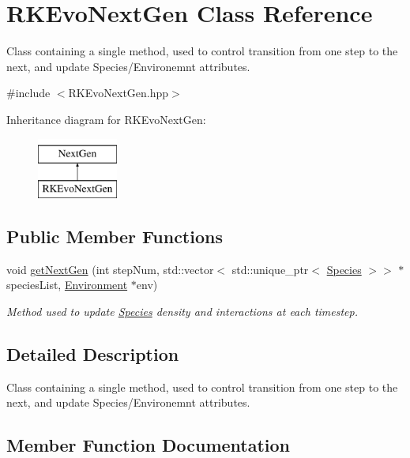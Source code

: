 \hypertarget{classRKEvoNextGen}{}\section{R\+K\+Evo\+Next\+Gen Class Reference}
\label{classRKEvoNextGen}


Class containing a single method, used to control transition from one step to the next, and update Species/\+Environemnt attributes.  




{\ttfamily \#include $<$R\+K\+Evo\+Next\+Gen.\+hpp$>$}

Inheritance diagram for R\+K\+Evo\+Next\+Gen\+:\begin{figure}[H]
\begin{center}
\leavevmode
\includegraphics[height=2.000000cm]{classRKEvoNextGen}
\end{center}
\end{figure}
\subsection*{Public Member Functions}
\begin{DoxyCompactItemize}
\item 
void \hyperlink{classRKEvoNextGen_a129cfd567dc8cacd95ca684b1378a43e}{get\+Next\+Gen} (int step\+Num, std\+::vector$<$ std\+::unique\+\_\+ptr$<$ \hyperlink{classSpecies}{Species} $>$$>$ $\ast$species\+List, \hyperlink{classEnvironment}{Environment} $\ast$env)
\begin{DoxyCompactList}\small\item\em Method used to update \hyperlink{classSpecies}{Species} density and interactions at each timestep. \end{DoxyCompactList}\end{DoxyCompactItemize}


\subsection{Detailed Description}
Class containing a single method, used to control transition from one step to the next, and update Species/\+Environemnt attributes. 

\subsection{Member Function Documentation}
\mbox{\label{classRKEvoNextGen_a129cfd567dc8cacd95ca684b1378a43e}} 
